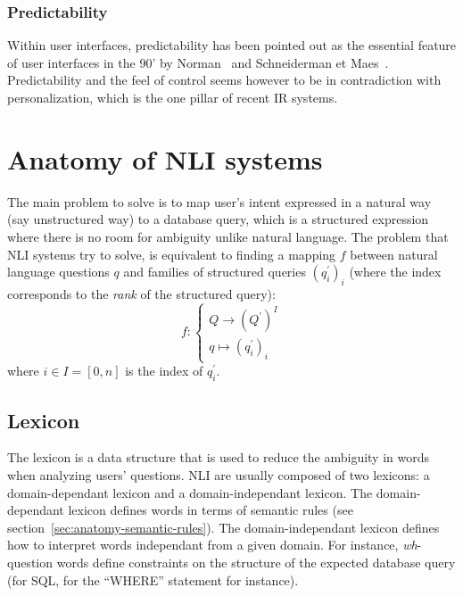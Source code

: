 \documentclass[10pt,journal,letterpaper,compsoc]{IEEEtran}
\begin{document}
\subsubsection{Predictability}
Within user interfaces, predictability has been pointed out as the essential
feature of user interfaces in the 90' by
Norman~\cite{Norman:1994:MPI:176789.176796} and Schneiderman et
Maes~\cite{Shneiderman:1997:DMV:267505.267514}. 
Predictability and the feel of control seems however to be in contradiction with
personalization, which is the one pillar of recent IR systems. 
















\section{Anatomy of NLI systems}
\label{sec:anatomy}
The main problem to solve is to map user's intent expressed in a natural way
(say unstructured way) to a database query, which is a structured expression
where there is no room for ambiguity unlike natural language. The problem that
NLI systems try to solve, is equivalent to finding a mapping $f$ between natural
language questions $q$ and families of structured queries $(q^\prime_i)_i$
(where the index corresponds to the \emph{rank} of the structured query):
$$f:\left\{
\begin{array}{l}
Q\rightarrow (Q^\prime)^I\\
q\mapsto(q^\prime_i)_i
\end{array}\right.$$
where $i\in I=[0,n]$ is the index of $q^\prime_i$.
 


\subsection{Lexicon}
The lexicon is a data structure that is used to reduce the ambiguity in words
when analyzing users' questions. 
NLI are usually composed of two lexicons: a domain-dependant lexicon and a
domain-independant lexicon. 
The domain-dependant lexicon defines words in terms of semantic rules (see
section~\ref{sec:anatomy-semantic-rules}).
The domain-independant lexicon defines how to interpret words independant from a
given domain. For instance, {\it wh}-question words define constraints on the
structure of the expected database query (for SQL, for the ``WHERE'' statement
for instance). 
\end{document}
